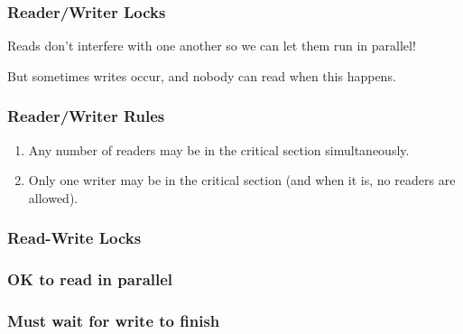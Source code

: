 \begin{frame}
\frametitle{Reader/Writer Locks}
Reads don't interfere with one another so we can let them run in parallel!

But sometimes writes occur, and nobody can read when this happens.

\end{frame}

\begin{frame}
\frametitle{Reader/Writer Rules}


\begin{enumerate}
\item Any number of readers may be in the critical section simultaneously.
\item Only one writer may be in the critical section (and when it is, no readers are allowed).
\end{enumerate}


\end{frame}



\begin{frame}
  \frametitle{Read-Write Locks}

  \begin{center}
    
  \end{center}
\end{frame}

\begin{frame}
  \frametitle{OK to read in parallel}

  \begin{center}
    
  \end{center}
\end{frame}

\begin{frame}
  \frametitle{Must wait for write to finish}

  \begin{center}
    
  \end{center}
\end{frame}




